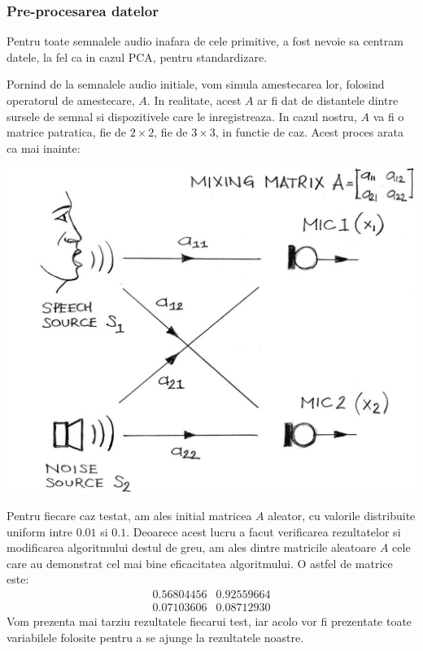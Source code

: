 \documentclass[12pt]{article}
\begin{document}
\subsubsection{Pre-procesarea datelor}
Pentru toate semnalele audio inafara de cele primitive, a fost nevoie sa centram datele, la fel ca in cazul PCA, pentru standardizare. 

Pornind de la semnalele audio initiale, vom simula amestecarea lor, folosind operatorul de amestecare, $A$. In realitate, acest $A$ ar fi dat de distantele dintre sursele de semnal si dispozitivele care le inregistreaza. In cazul nostru, $A$ va fi o matrice patratica, fie de $2 \times 2$, fie de $3 \times 3$, in functie de caz. Acest proces arata ca mai inainte:
\begin{center}
	\includegraphics[scale=0.3]{two-sound-sources}
 \end{center}

Pentru fiecare caz testat, am ales initial matricea $A$ aleator, cu valorile distribuite uniform intre $0.01$ si $0.1$. Deoarece acest lucru a facut verificarea rezultatelor si modificarea algoritmului destul de greu, am ales dintre matricile aleatoare $A$ cele care au demonstrat cel mai bine eficacitatea algoritmului. O astfel de matrice este:
\[
 \begin{matrix}
 	0.56804456  & 0.92559664 \\
	0.07103606  & 0.08712930 
 \end{matrix}
\]
Vom prezenta mai tarziu rezultatele fiecarui test, iar acolo vor fi prezentate toate variabilele folosite pentru a se ajunge la rezultatele noastre.
\end{document}
